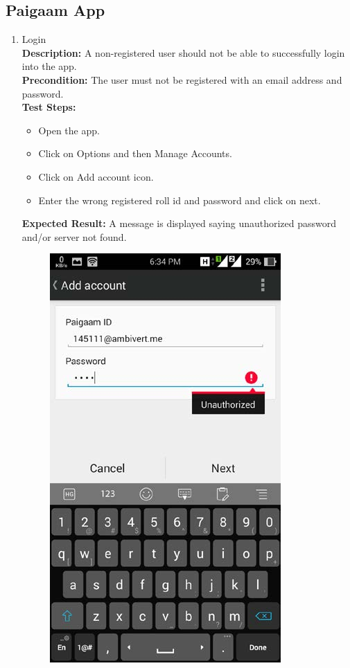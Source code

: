 \subsection{Paigaam App}
\begin{enumerate}
\item Login\\
\noindent \textbf{Description:}
A non-registered user should not be able to successfully login into the app.\\
\noindent \textbf{Precondition:}
The user must not be registered with an email address and password.\\
\noindent \textbf{Test Steps:}
\begin{itemize}
\item Open the app.
\item Click on Options and then Manage Accounts.
\item Click on Add account icon.
\item Enter the wrong registered roll id and password and click on next.
\end{itemize}
\noindent \textbf{Expected Result:}
A message is displayed saying unauthorized password and/or server not found.\\
\begin{figure}[ht]
\centering
\includegraphics[scale=0.3]{input/images/s1.png}

\end{figure}
\end{enumerate}
